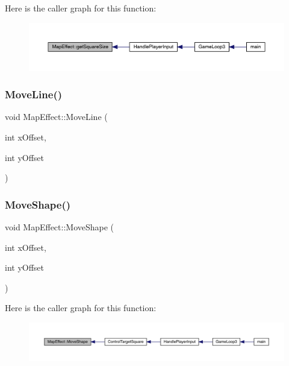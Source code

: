 Here is the caller graph for this function\+:
\nopagebreak
\begin{figure}[H]
\begin{center}
\leavevmode
\includegraphics[width=350pt]{de/de4/class_map_effect_aa96fb614319095fdc9003d85ea4647e2_icgraph}
\end{center}
\end{figure}
\mbox{\label{class_map_effect_a0436f9350a55dabc183dd66024dc7895}} 
\subsubsection{\texorpdfstring{Move\+Line()}{MoveLine()}}
{\footnotesize\ttfamily void Map\+Effect\+::\+Move\+Line (\begin{DoxyParamCaption}\item[{int}]{x\+Offset,  }\item[{int}]{y\+Offset }\end{DoxyParamCaption})}

\mbox{\label{class_map_effect_a4a775648e056eda586a1d627467552d7}} 
\subsubsection{\texorpdfstring{Move\+Shape()}{MoveShape()}}
{\footnotesize\ttfamily void Map\+Effect\+::\+Move\+Shape (\begin{DoxyParamCaption}\item[{int}]{x\+Offset,  }\item[{int}]{y\+Offset }\end{DoxyParamCaption})}

Here is the caller graph for this function\+:
\nopagebreak
\begin{figure}[H]
\begin{center}
\leavevmode
\includegraphics[width=350pt]{de/de4/class_map_effect_a4a775648e056eda586a1d627467552d7_icgraph}
\end{center}
\end{figure}
\mbox{\label{class_map_effect_a4782568b5d45629c080fdf183943ea29}} 
